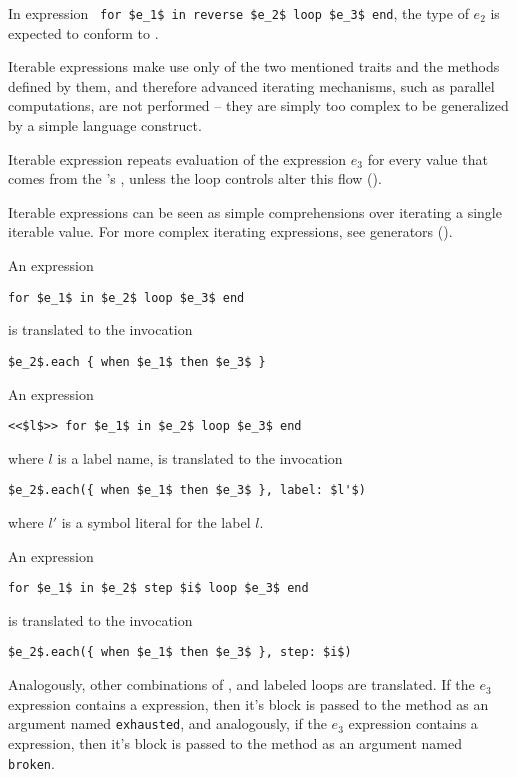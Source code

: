In expression ~\lstinline!for $e_1$ in reverse $e_2$ loop $e_3$ end!, the type of $e_2$ is expected to conform to . 

Iterable expressions make use only of the two mentioned traits and the methods defined by them, and therefore advanced iterating mechanisms, such as parallel computations, are not performed -- they are simply too complex to be generalized by a simple language construct. 

Iterable expression repeats evaluation of the expression $e_3$ for every value that comes from the 's , unless the loop controls alter this flow ().

Iterable expressions can be seen as simple comprehensions over iterating a single iterable value. For more complex iterating expressions, see generators ().

An expression 
\begin{lstlisting}
for $e_1$ in $e_2$ loop $e_3$ end
\end{lstlisting} 
is translated to the invocation
\begin{lstlisting}
$e_2$.each { when $e_1$ then $e_3$ }
\end{lstlisting} 

An expression 
\begin{lstlisting}
<<$l$>> for $e_1$ in $e_2$ loop $e_3$ end
\end{lstlisting} 
where $l$ is a label name, is translated to the invocation
\begin{lstlisting}[deletekeywords={label}]
$e_2$.each({ when $e_1$ then $e_3$ }, label: $l'$)
\end{lstlisting}
where $l'$ is a symbol literal for the label $l$. 

An expression 
\begin{lstlisting}
for $e_1$ in $e_2$ step $i$ loop $e_3$ end
\end{lstlisting} 
is translated to the invocation
\begin{lstlisting}[deletekeywords={step}]
$e_2$.each({ when $e_1$ then $e_3$ }, step: $i$)
\end{lstlisting} 

Analogously, other combinations of ,  and labeled loops are translated. If the $e_3$ expression contains a  expression, then it's block is passed to the  method as an argument named \lstinline[deletekeywords={exhausted}]{exhausted}, and analogously, if the $e_3$ expression contains a  expression, then it's block is passed to the  method as an argument named \lstinline[deletekeywords={broken}]{broken}.







